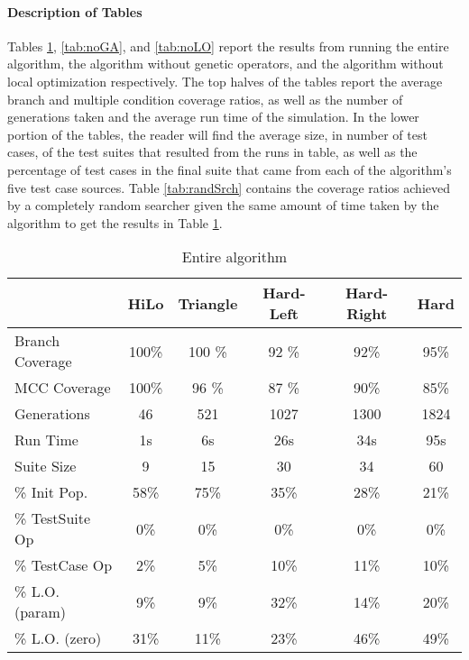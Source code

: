 \documentclass[runningheads]{llncs}
\begin{document}
\paragraph{Description of Tables} Tables \ref{tab:entireAlg}, \ref{tab:noGA}, and \ref{tab:noLO} report the results from running the entire algorithm, the algorithm without genetic operators, and the algorithm without local optimization respectively. The top halves of the tables report the average branch and multiple condition coverage ratios, as well as the number of generations taken and the average run time of the simulation. In the lower portion of the tables, the reader will find the average size, in number of test cases, of the test suites that resulted from the runs in table, as well as the percentage of test cases in the final suite that came from each of the algorithm's five test case sources. Table \ref{tab:randSrch} contains the coverage ratios achieved by a completely random searcher given the same amount of time taken by the algorithm to get the results in Table \ref{tab:entireAlg}.

\begin{table}[h!]
	\begin{center}
		\def\arraystretch{1.2}%
		\setlength\tabcolsep{1em}
		\begin{tabular}{| l | c  c  c  c c |}
			\hline
				             & HiLo  		 & Triangle		& Hard-Left	& 	Hard-Right 		& Hard		\\ \hline
			Branch Coverage	 & 100\%         & 100	\%      & 92 \%      	& 92\%          & 95\%      \\ \hline
			MCC Coverage	 & 100\%         & 96 \%        & 87 \%      	& 90\%          & 85\%      \\ \hline
			Generations		 & 46          	 & 521          & 1027       	& 1300          & 1824      \\ \hline
			Run Time		 & 1s          	 & 6s           & 26s       	& 34s          	& 95s       \\ \hhline{|=|=====|}
			
			Suite Size       & 9        	& 15       	 	& 30			& 34          	& 60        \\ \hline
			\% Init Pop.     & 58\%         & 75\%       	& 35\%       	& 28\%         	& 21\%      \\ \hline
			\% TestSuite Op  & 0\%          & 0\%       	& 0\%			& 0\%          	& 0\%       \\ \hline
			\% TestCase Op   & 2\%          & 5\%       	& 10\%      	& 11\%         	& 10\%      \\ \hline
			\% 	L.O. (param) & 9\%          & 9\%       	& 32\%       	& 14\%          & 20\%      \\ \hline
			\% L.O. (zero)	 & 31\%         & 11\%      	& 23\%       	& 46\%          & 49\%      \\ \hline
		\end{tabular}
	\end{center}
	\caption{Entire algorithm}  
	\label{tab:entireAlg}
\end{table}
\end{document}
